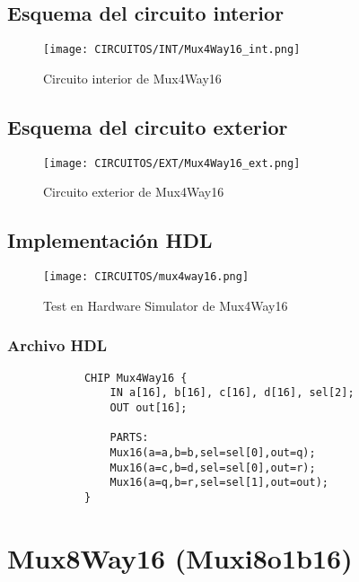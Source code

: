 \documentclass[12pt]{article}
\begin{document}
		\subsection{Esquema del circuito interior}
		\begin{figure}[H]
			\centering
			\texttt{[image: CIRCUITOS/INT/Mux4Way16\_int.png]}            \caption{Circuito interior de Mux4Way16 \cite{circuitverse}}
			\label{fig:mux4way16_int}
		\end{figure}
		\subsection{Esquema del circuito exterior}
		\begin{figure}[H]
			\centering
			\texttt{[image: CIRCUITOS/EXT/Mux4Way16\_ext.png]}            \caption{Circuito exterior de Mux4Way16 \cite{circuitverse}}
			\label{fig:mux4way16_ext}
		\end{figure}
		\subsection{Implementación HDL}
		\begin{figure}[H]
			\centering
			\texttt{[image: CIRCUITOS/mux4way16.png]}
			\caption{Test en Hardware Simulator de Mux4Way16 \cite{nand2tetris}}
			\label{fig:hdlmux4way16}
		\end{figure}
		\subsubsection{Archivo HDL}
		\begin{lstlisting}
			CHIP Mux4Way16 {
				IN a[16], b[16], c[16], d[16], sel[2];
				OUT out[16];

				PARTS:
				Mux16(a=a,b=b,sel=sel[0],out=q);
				Mux16(a=c,b=d,sel=sel[0],out=r);
				Mux16(a=q,b=r,sel=sel[1],out=out);
			}
		\end{lstlisting}
		\newpage


		\section{Mux8Way16 (Muxi8o1b16)}
\end{document}
